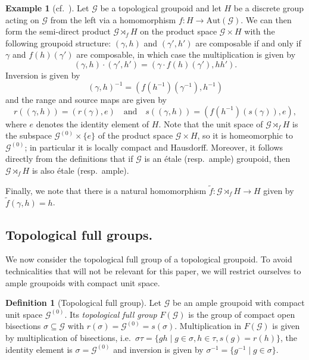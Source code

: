 \documentclass[10pt,a4paper]{amsart}
\numberwithin{equation}{section}
\numberwithin{figure}{section}
\theoremstyle{definition}
\newtheorem{defn}[thm]{Definition}
\newtheorem{ex}[thm]{Example}
\newcommand{\cG}{\mathcal{G}}
\begin{document}
\begin{ex}[{cf.\ \cite[Definition I.1.7]{Renault80}}]
\label{ex:semi-direct-product}
Let $\cG$ be a topological groupoid and let $H$ be a discrete group acting on $\cG$ from the left via a homomorphism $f \colon H \to \mathrm{Aut}(\cG)$. We can then form the semi-direct product $\cG \rtimes_f H$ on the product space $\cG \times H$ with the following groupoid structure: $(\gamma, h) $ and $ (\gamma', h')$ are composable if and only if $\gamma$ and $f(h)(\gamma')$ are composable, in which case the multiplication is given by
\[
(\gamma, h) \cdot (\gamma', h') = (\gamma \cdot f(h)(\gamma'),hh').
\]
Inversion is given by
\[
(\gamma,h)^{-1} = (f(h^{-1})(\gamma^{-1}),h^{-1})
\]
and the range and source maps are given by 
\[
r((\gamma,h)) = (r(\gamma),e) \quad\text{and}\quad s((\gamma,h)) = (f(h^{-1})(s(\gamma)),e),
\]
where $e$ denotes the identity element of $H$. Note that the unit space of $\cG \rtimes_f H$ is the subspace $\cG^{(0)} \times \{e\}$ of the product space $\cG \times H$, so it is homeomorphic to $\cG^{(0)}$; in particular it is locally compact and Hausdorff. Moreover, it follows directly from the definitions that if $\cG$ is an étale (resp.\ ample) groupoid, then $\cG \rtimes_f H$ is also étale (resp.\ ample).

Finally, we note that there is a natural homomorphism $\tilde{f} \colon \cG \rtimes_f H \to H$ given by $\tilde{f}(\gamma, h) = h$.
\end{ex}


\subsection{Topological full groups.}

We now consider the topological full group of a topological groupoid. To avoid technicalities that will not be relevant for this paper, we will restrict ourselves to ample groupoids with compact unit space.

\begin{defn}[Topological full group]
Let $\mathcal{G}$ be an ample groupoid with compact unit space $\mathcal{G}^{(0)}$. Its \emph{topological full group} $F(\mathcal{G})$ is the group of compact open bisections $\sigma \subseteq \mathcal{G}$ with $r(\sigma) = \mathcal{G}^{(0)} = s(\sigma)$. Multiplication in $F(\mathcal{G})$ is given by multiplication of bisections, i.e.\ $\sigma \tau = \{gh \mid g\in \sigma, h\in \tau, s(g) = r(h)\}$, the identity element is $\sigma = \mathcal{G}^{(0)}$ and inversion is given by $\sigma^{-1} = \{ g^{-1} \mid g \in \sigma \}$.
\end{defn}
\end{document}
